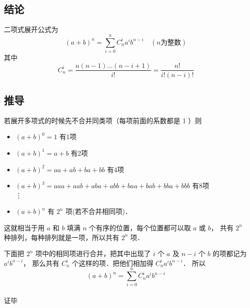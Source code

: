 \subsection{结论}
二项式展开公式为
\begin{equation}
(a + b)^n = \sum\limits_{i = 0}^n {C_n^i a^i b^{n - i}}\quad (n \text{为整数})
\end{equation}
其中
\begin{equation}
C_n^i = \frac{n(n - 1)\dots (n - i + 1)}{i!} = \frac{n!}{i!(n - i)!}
\end{equation}

\subsection{推导}
若展开多项式的时候先不合并同类项（每项前面的系数都是 1 ）则
\begin{itemize}
\item $(a + b)^0 = 1$ 有1项
\item $(a + b)^1 = a + b$ 有2项
\item $(a + b)^2 = aa + ab + ba + bb$ 有4项
\item $(a + b)^3 = aaa + aab + aba + abb + baa + bab + bba + bbb$ 有8项\\
\qquad \qquad \vdots
\item $(a + b)^n$ 有 $2^n$ 项(若不合并相同项)．
\end{itemize}

这就相当于用 $a$ 和 $b$ 填满 $n$ 个有序的位置，每个位置都可以取 $a$ 或 $b$， 共有 $2^n$ 种排列，每种排列就是一项，所以共有 $2^n$ 项．

下面把 $2^n$ 项中的相同项进行合并，把其中出现了 $i$ 个 $a$ 及 $n-i$ 个 $b$ 的项都记为 $a^i b^{n-i}$， 那么共有 $C_n^i$ 个这样的项．把他们相加得 $C_n^i a^i b^{n-i}$． 所以
\begin{equation}
(a + b)^n = \sum\limits_{i = 0}^n {C_n^i a^i b^{n - i}}
\end{equation} \\证毕